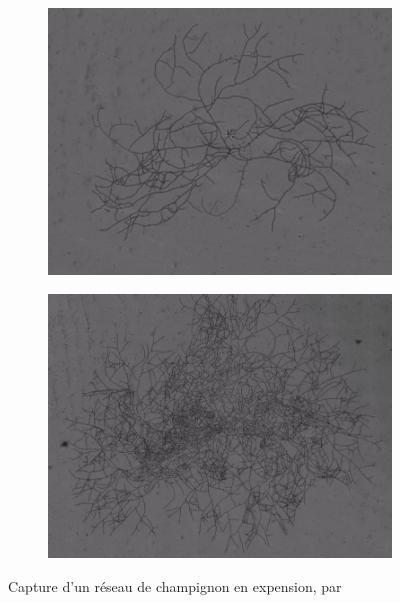 \documentclass[11pt]{article}
\theoremstyle{definition}
\begin{document}
\begin{figure}[hb]
\begin{subfigure}[b]{0.5\textwidth}
\end{subfigure}
\begin{subfigure}[b]{0.5\textwidth}
\includegraphics[width=\textwidth]{Images/3.png}
\end{subfigure}
\begin{subfigure}[b]{0.5\textwidth}
\includegraphics[width=\textwidth]{Images/4.png}
\end{subfigure}
\caption{Capture d'un réseau de champignon en expension, par}
\end{figure}
\newpage
\tableofcontents
\newpage

\newpage
\newpage
\end{document}
